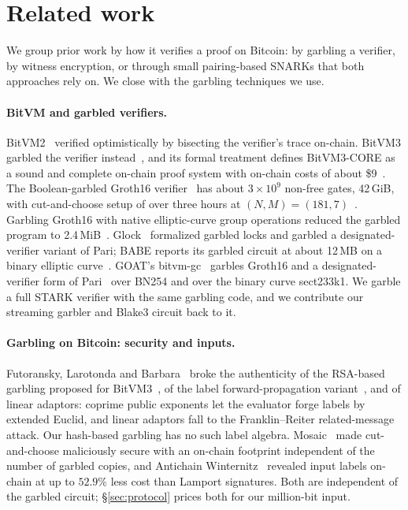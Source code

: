 \documentclass[11pt]{article}
\begin{document}
\section{Related work}\label{sec:related}

We group prior work by how it verifies a proof on Bitcoin: by garbling a verifier,
by witness encryption, or through small pairing-based SNARKs that both approaches
rely on. We close with the garbling techniques we use.

\paragraph{BitVM and garbled verifiers.} BitVM2~\cite{laa25bitvm2} verified
optimistically by bisecting the verifier's trace on-chain. BitVM3 garbled the
verifier instead~\cite{lin25bitvm3,che25sok}, and its formal treatment defines
BitVM3-CORE as a sound and complete on-chain proof system with on-chain costs of
about \$9~\cite{bitvm3paper}. The Boolean-garbled Groth16 verifier~\cite{bit25b}
has about $3\times10^9$ non-free gates, 42\,GiB, with cut-and-choose setup of over
three hours at $(N,M)=(181,7)$~\cite{babe2026}. Garbling Groth16 with native
elliptic-curve group operations reduced the garbled program to
2.4\,MiB~\cite{kflt26native}. Glock~\cite{eag25glock} formalized garbled locks and
garbled a designated-verifier variant of Pari; BABE reports its garbled circuit at
about 12\,MB on a binary elliptic curve~\cite{babe2026}. GOAT's
bitvm-gc~\cite{bitvmgc} garbles Groth16 and a designated-verifier form of
Pari~\cite{garudapari} over BN254 and over the binary curve sect233k1. We garble a
full STARK verifier with the same garbling code, and we contribute our streaming
garbler and Blake3 circuit back to it.

\paragraph{Garbling on Bitcoin: security and inputs.} Futoransky, Larotonda and
Barbara~\cite{flb25} broke the authenticity of the RSA-based garbling proposed for
BitVM3~\cite{lin25bitvm3}, of the label forward-propagation variant~\cite{fdz25},
and of linear adaptors: coprime public exponents let the evaluator forge labels by
extended Euclid, and linear adaptors fall to the Franklin--Reiter related-message
attack. Our hash-based garbling has no such label algebra. Mosaic~\cite{mosaic26}
made cut-and-choose maliciously secure with an on-chain footprint independent of
the number of garbled copies, and Antichain Winternitz~\cite{antichain26} revealed
input labels on-chain at up to $52.9\%$ less cost than Lamport signatures. Both
are independent of the garbled circuit; \S\ref{sec:protocol} prices both for our
million-bit input.
\end{document}
